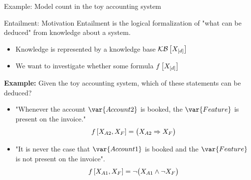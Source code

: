 \documentclass{beamer}
\begin{document}
\begin{frame}{Example: Model count in the toy accounting system}
\begin{center}
        \end{center}
    \end{frame}

    \begin{frame}{Entailment: Motivation}
        Entailment is the logical formalization of "what can be deduced" from knowledge about a system.
        \begin{itemize}
            \item Knowledge is represented by a knowledge base $\mathcal{KB}\left[X_{[d]}\right]$
            \item We want to investigate whether some formula $f\left[X_{[d]}\right]$
        \end{itemize}

            {\bf Example:}
        Given the toy accounting system, which of these statements can be deduced?
        \begin{itemize}
            \item "Whenever the account $\var{Account 2}$ is booked, the $\var{Feature}$ is present on the invoice."
            \begin{align*}
                f\left[X_{A2},X_{F}\right] = \big(X_{A2}\Rightarrow X_{F}\big)
            \end{align*}
            \item "It is never the case that $\var{Account 1}$ is booked and the $\var{Feature}$ is not present on the invoice".
            \begin{align*}
                f\left[X_{A1},X_{F}\right] = \lnot\big(X_{A1}\land\lnot X_{F}\big)
            \end{align*}
        \end{itemize}


    \end{frame}
\end{document}
